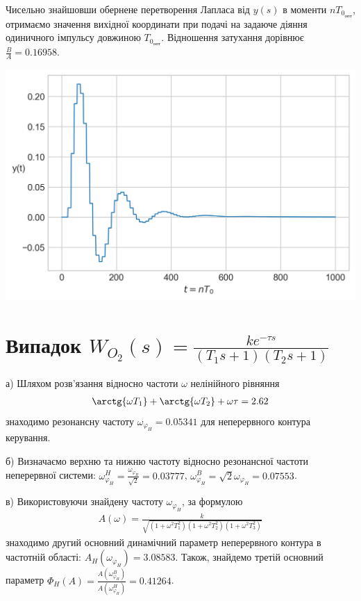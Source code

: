Чисельно знайшовши обернене перетворення Лапласа від $y(s)$ в моменти $n T_{0_{\text{опт}}}$, 
отримаємо значення вихідної координати при подачі на задаюче діяння одиничного імпульсу довжиною $T_{0_{\text{опт}}}$. 
Відношення затухання дорівнює $\frac{B}{A} = 0.16958$.
\begin{center}
    \includegraphics[scale=0.75]{pics/transient_process_task_5_1.png}
\end{center}

\section{Випадок \texorpdfstring{$W_{O_2}(s) = \frac{k e^{-\tau s}}{(T_1 s + 1)(T_2 s + 1)}$}{2}}
а)\;  Шляхом розв'язання відносно частоти $\omega$ нелінійного рівняння
\begin{gather}
    \arctg{\omega T_1} + \arctg{\omega T_2} + \omega \tau = 2.62
\end{gather}
знаходимо резонансну частоту $\omega_{\varphi_H} = 0.05341$ для неперервного контура керування.

б)\;  Визначаємо верхню та нижню частоту відносно резонансної частоти неперервної системи:
$\omega_{\varphi_H}^H = \frac{\omega_{\varphi_H}}{\sqrt{2}} = 0.03777$, 
$\omega_{\varphi_H}^B = {\sqrt{2}}{\omega_{\varphi_H}} = 0.07553$.

в)\; Використовуючи знайдену частоту $\omega_{\varphi_H}$, за формулою
\begin{gather}
    A(\omega) = \frac{k}{\sqrt{\left(1+\omega^2 T_1^2\right)\left(1+\omega^2 T_2^2\right)\left(1+\omega^2 T_3^2\right)}}
\end{gather}
знаходимо другий основний динамічний параметр неперервного контура в частотній області:
$A_H\left(\omega_{\varphi_H}\right) = 3.08583$. Також, знайдемо третій основний параметр
$\Phi_H(A) = \frac{A\left(\omega_{\varphi_H}^B\right)}{A\left(\omega_{\varphi_H}^H\right)} = 0.41264$.

